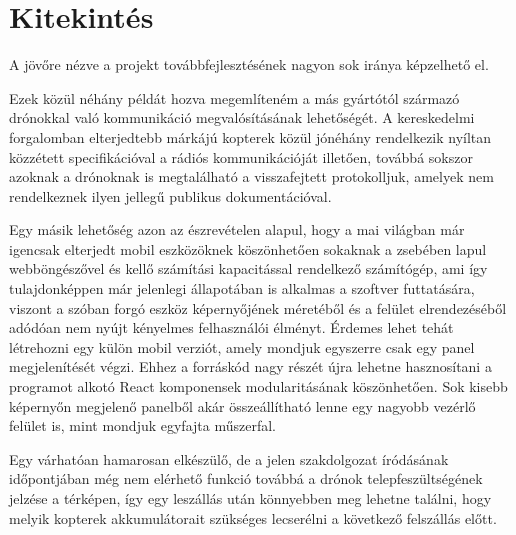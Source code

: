 \section{Kitekintés}

A jövőre nézve a projekt továbbfejlesztésének nagyon sok iránya képzelhető el.

Ezek közül néhány példát hozva megemlíteném a más gyártótól származó drónokkal
való kommunikáció megvalósításának lehetőségét. A kereskedelmi forgalomban
elterjedtebb márkájú kopterek közül jónéhány rendelkezik nyíltan közzétett
specifikációval a rádiós kommunikációját illetően, továbbá sokszor azoknak a
drónoknak is megtalálható a visszafejtett protokolljuk, amelyek nem rendelkeznek
ilyen jellegű publikus dokumentációval.

Egy másik lehetőség azon az észrevételen alapul, hogy a mai világban már
igencsak elterjedt mobil eszközöknek köszönhetően sokaknak a zsebében lapul
webböngészővel és kellő számítási kapacitással rendelkező számítógép, ami így
tulajdonképpen már jelenlegi állapotában is alkalmas a szoftver futtatására,
viszont a szóban forgó eszköz képernyőjének méretéből és a felület
elrendezéséből adódóan nem nyújt kényelmes felhasználói élményt. Érdemes lehet
tehát létrehozni egy külön mobil verziót, amely mondjuk egyszerre csak egy panel
megjelenítését végzi. Ehhez a forráskód nagy részét újra lehetne hasznosítani a
programot alkotó React komponensek modularitásának köszönhetően. Sok kisebb
képernyőn megjelenő panelből akár összeállítható lenne egy nagyobb vezérlő
felület is, mint mondjuk egyfajta műszerfal.

Egy várhatóan hamarosan elkészülő, de a jelen szakdolgozat íródásának
időpontjában még nem elérhető funkció továbbá a drónok telepfeszültségének
jelzése a térképen, így egy leszállás után könnyebben meg lehetne találni, hogy
melyik kopterek akkumulátorait szükséges lecserélni a következő felszállás
előtt.
